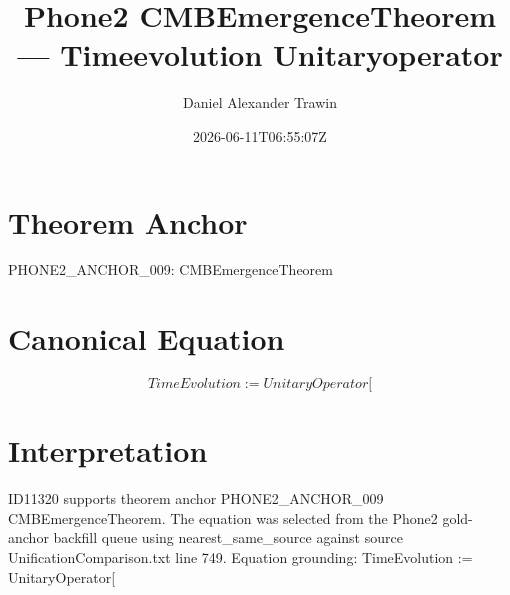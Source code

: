 \documentclass[11pt]{article}
\title{Phone2 CMBEmergenceTheorem — Timeevolution Unitaryoperator}
\author{Daniel Alexander Trawin}
\date{2026-06-11T06:55:07Z}
\begin{document}
\maketitle
\section*{Theorem Anchor}
PHONE2_ANCHOR_009: CMBEmergenceTheorem
\section*{Canonical Equation}
\[
TimeEvolution := UnitaryOperator[
\]
\section*{Interpretation}
ID11320 supports theorem anchor PHONE2_ANCHOR_009 CMBEmergenceTheorem. The equation was selected from the Phone2 gold-anchor backfill queue using nearest_same_source against source UnificationComparison.txt line 749. Equation grounding: TimeEvolution := UnitaryOperator[
\end{document}
